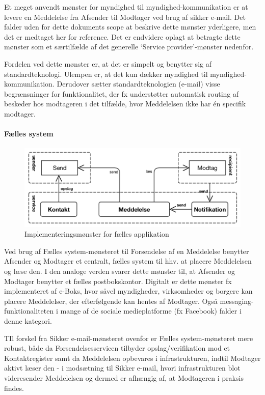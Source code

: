 Et meget anvendt mønster for myndighed til myndighed-kommunikation er at
levere en Meddelelse fra Afsender til Modtager ved brug af sikker
e-mail. Det falder uden for dette dokuments scope at beskrive dette
mønster yderligere, men det er medtaget her for reference. Det er
endvidere oplagt at betragte dette mønster som et særtilfælde af det
generelle `Service provider'-mønster nedenfor.

Fordelen ved dette mønster er, at det er simpelt og benytter sig af
standardteknologi. Ulempen er, at det kun dækker myndighed til
myndighed-kommunikation. Derudover sætter standardteknologien (e-mail)
visse begrænsninger for funktionalitet, der fx understøtter automatisk
routing af beskeder hos modtageren i det tilfælde, hvor Meddelelsen ikke
har én specifik modtager.

\paragraph{Fælles system}\label{fuxe6lles-system}

\begin{figure}
\centering
\includegraphics[width=\textwidth]{figures/send-shared.png}
\caption{Implementeringsmønster for fælles applikation}
\end{figure}

Ved brug af Fælles system-mønsteret til Forsendelse af en Meddelelse
benytter Afsender og Modtager et centralt, fælles system til hhv. at
placere Meddelelsen og læse den. I den analoge verden svarer dette
mønster til, at Afsender og Modtager benytter et fælles postbokskontor.
Digitalt er dette mønster fx implementeret af e-Boks, hvor såvel
myndigheder, virksomheder og borgere kan placere Meddelelser, der
efterfølgende kan hentes af Modtager. Også messaging-funktionaliteten i
mange af de sociale medieplatforme (fx Facebook) falder i denne
kategori.

TIl forskel fra Sikker e-mail-mønsteret ovenfor er Fælles
system-mønsteret mere robust, både da Forsendelsesservicen tilbyder
opslag/verifikation mod et Kontaktregister samt da Meddelelsen opbevares
i infrastrukturen, indtil Modtager aktivt læser den - i modsætning til
Sikker e-mail, hvori infrastrukturen blot videresender Meddelelsen og
dermed er afhængig af, at Modtageren i praksis findes.

